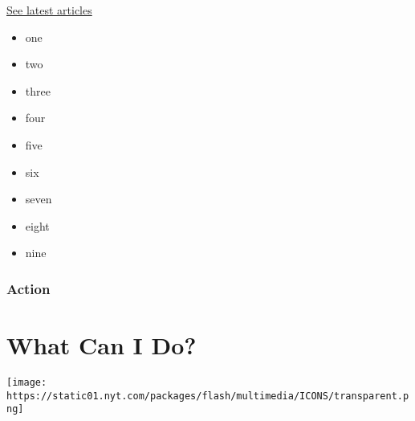 \href{https://nytimes.com/spotlight/privacy-project-regulation-solutions}{See
latest articles}

\begin{itemize}
\tightlist
\item
  one
\item
  two
\item
  three
\item
  four
\item
  five
\item
  six
\item
  seven
\item
  eight
\item
  nine
\end{itemize}

\hypertarget{action-1}{%
\subsubsection{Action}\label{action-1}}

\hypertarget{what-can-i-do-1}{%
\section{What Can I Do?}\label{what-can-i-do-1}}

\texttt{[image: https://static01.nyt.com/packages/flash/multimedia/ICONS/transparent.png]}

